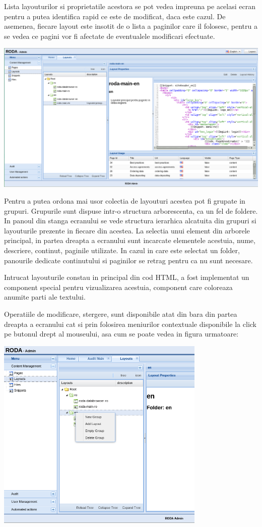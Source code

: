 Lista layouturilor si proprietatile acestora se pot vedea impreuna
pe acelasi ecran pentru a putea identifica rapid ce este de modificat,
daca este cazul. De asemenea, fiecare layout este insotit de o lista
a paginilor care il folosesc, pentru a se vedea ce pagini vor fi afectate
de eventualele modificari efectuate. 

\includegraphics[width=15cm]{cms/backend/layout/cmslayout1}

Pentru a putea ordona mai usor colectia de layouturi acestea pot fi
grupate in grupuri. Grupurile sunt dispuse intr-o structura arborescenta,
ca un fel de foldere. In panoul din stanga ecranului se vede structura
ierarhica alcatuita din grupuri si layouturile prezente in fiecare
din acestea. La selectia unui element din arborele principal, in partea
dreapta a ecranului sunt incarcate elementele acestuia, nume, descriere,
continut, paginile utilizate. In cazul in care este selectat un folder,
panourile dedicate continutului si paginilor se retrag pentru ca nu
sunt necesare. 

Intrucat layouturile constau in principal din cod HTML, a fost implementat
un component special pentru vizualizarea acestuia, component care
coloreaza anumite parti ale textului. 

Operatiile de modificare, stergere, sunt disponibile atat din bara
din partea dreapta a ecranului cat si prin folosirea meniurilor contextuale
disponibile la click pe butonul drept al mouseului, asa cum se poate
vedea in figura urmatoare:

\includegraphics[width=10cm]{cms/backend/layout/cmslayout2}

